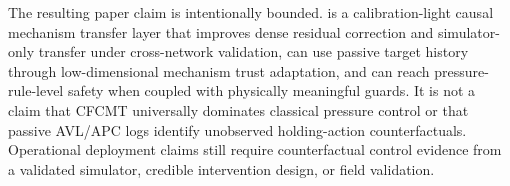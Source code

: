 The resulting paper claim is intentionally bounded.
\ours is a calibration-light causal mechanism transfer layer that improves dense residual correction and simulator-only transfer under cross-network validation, can use passive target history through low-dimensional mechanism trust adaptation, and can reach pressure-rule-level safety when coupled with physically meaningful guards.
It is not a claim that CFCMT universally dominates classical pressure control or that passive AVL/APC logs identify unobserved holding-action counterfactuals.
Operational deployment claims still require counterfactual control evidence from a validated simulator, credible intervention design, or field validation.
